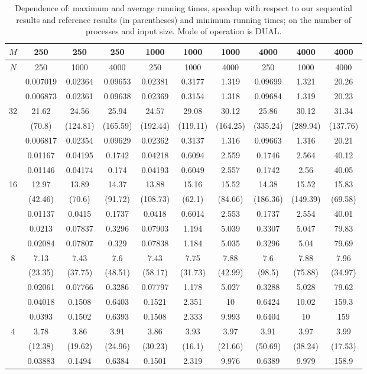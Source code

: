 \begin{table}[h]
\centering
\begin{tabular}{c|c|c|c|c|c|c|c|c|c|}
\hline
$M$ & 250 & 250 & 250 & 1000 & 1000 & 1000 & 4000 & 4000 & 4000 \\
\hline
$N$ & 250 & 1000 & 4000 & 250 & 1000 & 4000 & 250 & 1000 & 4000 \\
\hline
 & 0.007019 & 0.02364 & 0.09653 & 0.02381 & 0.3177 & 1.319 & 0.09699 & 1.321 & 20.26 \\
 & 0.006873 & 0.02361 & 0.09638 & 0.02369 & 0.3154 & 1.318 & 0.09684 & 1.319 & 20.23 \\
32 & 21.62 & 24.56 & 25.94 & 24.57 & 29.08 & 30.12 & 25.86 & 30.12 & 31.34 \\
 & (70.8) & (124.81) & (165.59) & (192.44) & (119.11) & (164.25) & (335.24) & (289.94) & (137.76) \\
 & 0.006817 & 0.02354 & 0.09629 & 0.02362 & 0.3137 & 1.316 & 0.09663 & 1.316 & 20.21 \\
\hline
 & 0.01167 & 0.04195 & 0.1742 & 0.04218 & 0.6094 & 2.559 & 0.1746 & 2.564 & 40.12 \\
 & 0.01146 & 0.04174 & 0.174 & 0.04193 & 0.6049 & 2.557 & 0.1742 & 2.56 & 40.05 \\
16 & 12.97 & 13.89 & 14.37 & 13.88 & 15.16 & 15.52 & 14.38 & 15.52 & 15.83 \\
 & (42.46) & (70.6) & (91.72) & (108.73) & (62.1) & (84.66) & (186.36) & (149.39) & (69.58) \\
 & 0.01137 & 0.0415 & 0.1737 & 0.0418 & 0.6014 & 2.553 & 0.1737 & 2.554 & 40.01 \\
\hline
 & 0.0213 & 0.07837 & 0.3296 & 0.07903 & 1.194 & 5.039 & 0.3307 & 5.047 & 79.83 \\
 & 0.02084 & 0.07807 & 0.329 & 0.07838 & 1.184 & 5.035 & 0.3296 & 5.04 & 79.69 \\
8 & 7.13 & 7.43 & 7.6 & 7.43 & 7.75 & 7.88 & 7.6 & 7.88 & 7.96 \\
 & (23.35) & (37.75) & (48.51) & (58.17) & (31.73) & (42.99) & (98.5) & (75.88) & (34.97) \\
 & 0.02061 & 0.07766 & 0.3286 & 0.07797 & 1.178 & 5.027 & 0.3288 & 5.028 & 79.62 \\
\hline
 & 0.04018 & 0.1508 & 0.6403 & 0.1521 & 2.351 & 10 & 0.6424 & 10.02 & 159.3 \\
 & 0.0393 & 0.1502 & 0.6393 & 0.1508 & 2.333 & 9.993 & 0.6404 & 10 & 159 \\
4 & 3.78 & 3.86 & 3.91 & 3.86 & 3.93 & 3.97 & 3.91 & 3.97 & 3.99 \\
 & (12.38) & (19.62) & (24.96) & (30.23) & (16.1) & (21.66) & (50.69) & (38.24) & (17.53) \\
 & 0.03883 & 0.1494 & 0.6384 & 0.1501 & 2.319 & 9.976 & 0.6389 & 9.979 & 158.9 \\
\hline
\end{tabular}
\caption{Dependence of: maximum and average running times, speedup with respect to our sequential results and reference results (in parentheses) and minimum running times; on the number of processes and input size. Mode of operation is DUAL.}
\end{table}

